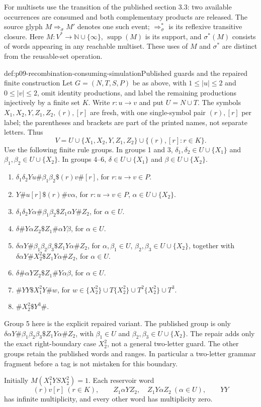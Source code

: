 For multisets use the transition of the published section 3.3: two available
occurrences are consumed and both complementary products are released.
The source glyph \(M\Longrightarrow_\sigma M'\) denotes one such event;
\(\Longrightarrow_\sigma^*\) is its reflexive transitive closure.
Here \(M:V^*\to\mathbb N\cup\{\infty\}\), \(\operatorname{supp}(M)\)
is its support, and \(\sigma^*(M)\) consists of words appearing in any
reachable multiset. These uses of \(M\) and \(\sigma^*\) are distinct
from the reusable-set operation.

\begin{hbdefinition}{def:p09-recombination-consuming-simulation}{Published guards and the repaired finite construction}
Let \(G=(N,T,S,P)\) be as above, with \(1\leq|u|\leq2\) and
\(0\leq|v|\leq2\), omit identity productions, and label
the remaining productions injectively by a finite set \(K\).
Write \(r:u\to v\) and put \(U=N\cup T\).
The symbols \(X_1,X_2,Y,Z_1,Z_2,(r),[r]\) are fresh, with one
single-symbol pair \((r),[r]\) per label; the parentheses and brackets
are part of the printed names, not separate letters.
Thus
\[
 V=U\cup\{X_1,X_2,Y,Z_1,Z_2\}\cup\{(r),[r]:r\in K\}.
\]
Use the following finite rule groups. In groups 1 and 3,
\(\delta_1,\delta_2\in U\cup\{X_1\}\) and
\(\beta_1,\beta_2\in U\cup\{X_2\}\).
In groups 4--6, \(\delta\in U\cup\{X_1\}\) and
\(\beta\in U\cup\{X_2\}\).
\begin{enumerate}
\item \(\delta_1\delta_2Yu\#\beta_1\beta_2\$(r)v\#[r]\), for \(r:u\to v\in P\).
\item \(Y\#u[r]\$(r)\#v\alpha\), for \(r:u\to v\in P\), \(\alpha\in U\cup\{X_2\}\).
\item \(\delta_1\delta_2Y\alpha\#\beta_1\beta_2\$Z_1\alpha Y\#Z_2\), for \(\alpha\in U\).
\item \(\delta\#Y\alpha Z_2\$Z_1\#\alpha Y\beta\), for \(\alpha\in U\).
\item \(\delta\alpha Y\#\beta_1\beta_2\beta_3\$Z_1Y\alpha\#Z_2\), for \(\alpha,\beta_1\in U\), \(\beta_2,\beta_3\in U\cup\{X_2\}\), together with
 \(\delta\alpha Y\#X_2^2\$Z_1Y\alpha\#Z_2\), for \(\alpha\in U\).
\item \(\delta\#\alpha YZ_2\$Z_1\#Y\alpha\beta\), for \(\alpha\in U\).
\item \(\#YY\$X_1^2Y\#w\), for
 \(w\in\{X_2^2\}\cup T\{X_2^2\}\cup T^2\{X_2^2\}\cup T^3\).
\item \(\#X_2^2\$Y^3\#\).
\end{enumerate}
Group 5 here is the explicit repaired variant. The published group is only
\(\delta\alpha Y\#\beta_1\beta_2\beta_3\$Z_1Y\alpha\#Z_2\),
with \(\beta_1\in U\) and \(\beta_2,\beta_3\in U\cup\{X_2\}\).
The repair adds only the exact right-boundary case \(X_2^2\), not a
general two-letter guard. The other groups retain the published words and
ranges. In particular a two-letter grammar fragment before a tag is not
mistaken for this boundary.

Initially \(M(X_1^2YSX_2^2)=1\). Each reservoir word
\[
 (r)v[r]\ (r\in K),\qquad
 Z_1\alpha YZ_2,\quad Z_1Y\alpha Z_2\ (\alpha\in U),\qquad YY
\]
has infinite multiplicity, and every other word has multiplicity zero.
\end{hbdefinition}

